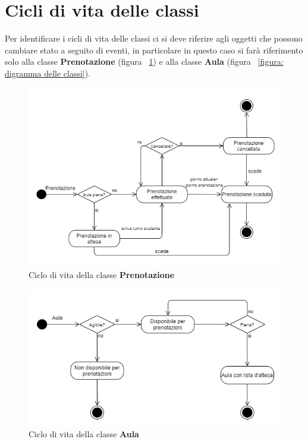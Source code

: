 \section{Cicli di vita delle classi}
Per identificare i cicli di vita delle classi ci si deve riferire agli oggetti che possono cambiare stato a seguito di eventi, in particolare in questo caso si farà riferimento solo alla classe  \textbf{Prenotazione} (figura ~\ref{figura: ciclo prenotazione}) e alla classe \textbf{Aula} (figura ~\ref{figura: digramma delle classi}).


\begin{figure}[H]
\begin{center}
  \includegraphics[width=1 \textwidth]{Figure/ciclo classe prenotazione.png}
    \caption{Ciclo di vita della classe \textbf{Prenotazione}}  \label{figura: ciclo prenotazione}
\end{center}
\end{figure}


\begin{figure}[H]
\begin{center}
  \includegraphics[width=1 \textwidth]{Figure/ciclo classe aula.png}
    \caption{Ciclo di vita della classe \textbf{Aula}}\label{figura: ciclo aula}
\end{center}
\end{figure}

